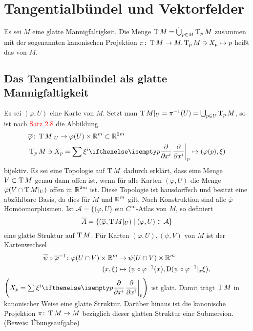 
\section{Tangentialbündel und Vektorfelder}

\begin{dfn}[Tangentialbündel]
  Es sei $M$ eine glatte Mannigfaltigkeit. Die Menge $\operatorname{T} M = \dot \bigcup_{p \in M}\operatorname{T}_pM$ zusammen mit der sogenannten kanonischen Projektion $\pi \colon \operatorname{T} M \to M, \operatorname{T}_pM \ni X_p \mapsto p$ heißt das  von $M$.
\end{dfn}

\subsection{Das Tangentialbündel als glatte Mannigfaltigkeit}

Es sei $(\varphi, U)$ eine Karte von $M$. Setzt man $\operatorname{T} M|_U = \pi^{-1}(U) = \dot \bigcup_{p\in U}\operatorname{T}_pM$, so ist nach \textcolor{red}{Satz 2.8} %
die Abbildung
\begin{align*}
  & \overline \varphi \colon \T M|_U \to \varphi(U) \times \R^m \subset \R^{2m}\\
  &\T_p M \ni X_p = \sum \xi^i\pdifffrac[p]{}{x^i} \mapsto (\varphi(p),\xi)
\end{align*}
bijektiv.
Es sei eine Topologie auf $\operatorname{T} M$ dadurch erklärt, dass eine Menge $V \subset \operatorname{T} M$ genau dann offen ist, wenn für alle Karten $(\varphi, U)$ die Menge $\overline \varphi(V \cap \operatorname{T} M|_U)$ offen in $\operatorname{\mathbb{R}}^{2m}$ ist. Diese Topologie ist hausdorffsch und besitzt eine abzählbare Basis, da dies für $M$ und $\operatorname{\mathbb{R}}^m$ gilt. Nach Konstruktion sind alle $\overline \varphi$ Homöomorphismen. Ist $\mathcal A = \{(\varphi, U\}$ ein $C^{\infty}$-Atlas von $M$, so definiert
\begin{align*}
  \overline A = \{(\overline \varphi, \operatorname{T} M|_U) \mid (\varphi, U) \in \mathcal A\}
\end{align*}
eine glatte Struktur auf $\operatorname{T} M$. Für Karten $(\varphi, U), (\psi, V)$ von $M$ ist der Kartenwechsel
\begin{align*}
  \overline \psi \circ \overline \varphi^{-1} \colon \varphi(U \cap V) \times \operatorname{\mathbb{R}}^m &\to \psi(U \cap V) \times \operatorname{\mathbb{R}}^m \\ \ (x, \xi) &\mapsto (\psi \circ \varphi^{-1}(x),\operatorname{D}(\psi \circ \varphi^{-1}|_x\xi),
\end{align*}
$\left(X_p = \sum \xi^i \pdifffrac[p]{}{x^i}\right)$ ist glatt. Damit trägt $\operatorname{T} M$ in kanonischer Weise eine glatte Struktur.
Darüber hinaus ist die kanonische Projektion $\pi \colon \operatorname{T} M \to M$ bezüglich dieser glatten Struktur eine Submersion. (Beweis: Übungsaufgabe)

